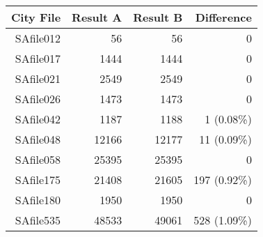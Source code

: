 \begin{tabular}{| r | r  r  r |}
\hline
\textbf{City File} & \textbf{Result A} & \textbf{Result B} & \textbf{Difference} \\
\hline
\hline
SAfile012 & 56 & 56 & 0 \\
SAfile017 & 1444 & 1444 & 0 \\
SAfile021 & 2549 & 2549 & 0 \\
SAfile026 & 1473 & 1473 & 0 \\
SAfile042 & 1187 & 1188 & 1 (0.08\%) \\
SAfile048 & 12166 & 12177 & 11 (0.09\%) \\
SAfile058 & 25395 & 25395 & 0 \\
SAfile175 & 21408 & 21605 & 197 (0.92\%) \\
SAfile180 & 1950 & 1950 & 0 \\
SAfile535 & 48533 & 49061 & 528 (1.09\%) \\
\hline
\end{tabular}
